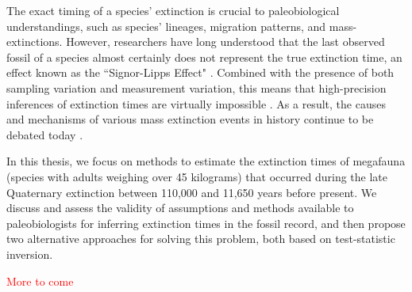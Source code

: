 The exact timing of a species' extinction is crucial to paleobiological understandings, such as species' lineages, migration patterns, and mass-extinctions. However, researchers have long understood that the last observed fossil of a species almost certainly does not represent the true extinction time, an effect known as the ``Signor-Lipps Effect" \cite{Signor1982}. Combined with the presence of both sampling variation and measurement variation, this means that high-precision inferences of extinction times are virtually impossible \cite{Bradshaw2012}. As a result, the causes and mechanisms of various mass extinction events in history continue to be debated today \cite{Saltre2015}.

In this thesis, we focus on methods to estimate the extinction times of megafauna (species with adults weighing over 45 kilograms) that occurred during the late Quaternary extinction between 110,000 and 11,650 years before present. We discuss and assess the validity of assumptions and methods available to paleobiologists for inferring extinction times in the fossil record, and then propose two alternative approaches for solving this problem, both based on test-statistic inversion.

\textcolor{red}{More to come}